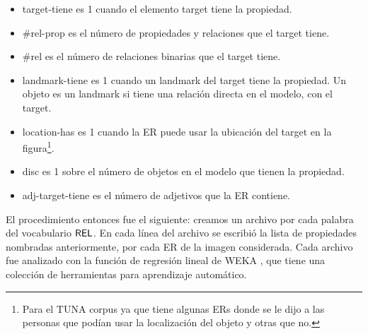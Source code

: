 \begin{itemize}
\item target-tiene es 1 cuando el elemento target tiene la propiedad. 
\item \#rel-prop es el n\'umero de propiedades y relaciones que el target tiene.
\item \#rel es el n\'umero de relaciones binarias que el target tiene. 
\item landmark-tiene es 1 cuando un landmark del target tiene la propiedad. Un objeto es un landmark si tiene una relaci\'on directa en el modelo, con el target.
\item location-has es 1 cuando la ER puede usar la ubicaci\'on del target en la figura\footnote{Para el TUNA corpus ya que tiene algunas ERs donde se le dijo a las personas que pod\'ian usar la localizaci\'on del objeto y otras que no.}.
\item disc es 1 sobre el n\'umero de objetos en el modelo que tienen la propiedad.  
\item adj-target-tiene es el n\'umero de adjetivos que la ER contiene.
\end{itemize}

El procedimiento entonces fue el siguiente:
creamos un archivo por cada palabra del vocabulario $\textsf{REL}$. En cada l\'inea del archivo 
se escribi\'o la lista de propiedades nombradas anteriormente, por cada ER de la imagen considerada. Cada archivo fue analizado con la funci\'on de regresi\'on lineal de WEKA \cite{Hall:WEK09}, que tiene una colecci\'on de herramientas para aprendizaje autom\'atico.

